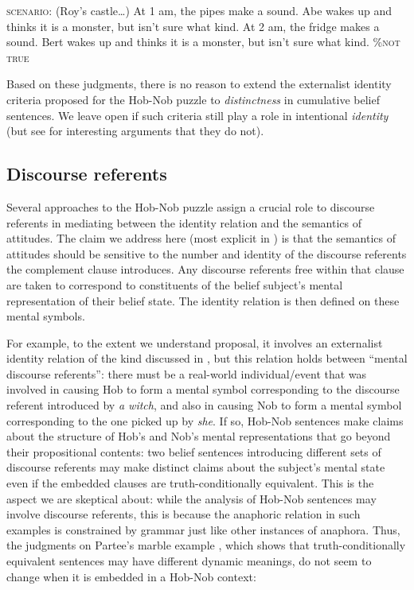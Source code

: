 \documentclass[output=paper]{langscibook}
\begin{document}
\eanoraggedright \label{sch-has:ex:51} \textsc{scenario}: (Roy's castle\ldots) At 1 am, the pipes make a sound. Abe wakes up and thinks it is a monster, but isn't sure what kind. At 2 am, the fridge makes a sound. Bert wakes up and thinks it is a monster, but isn't sure what kind.\hfill {} \textsc{\%not true} \z

\noindent Based on these judgments, there is no reason to extend the externalist identity criteria proposed for the Hob-Nob puzzle to \textit{distinctness} in cumulative belief sentences. We leave open if such criteria still play a role in intentional \textit{identity} (but see \citealt{Edelberg:1992} for interesting arguments that they do not).

\subsection{Discourse referents}\label{sch-has:sec:4.2}

Several approaches to the Hob-Nob puzzle \citep{Dekker:1998,Cumming:2007} assign a crucial role to discourse referents in mediating between the identity relation and the semantics of attitudes. The claim we address here (most explicit in \citealt{Cumming:2007}) is that the semantics of attitudes should be sensitive to the number and identity of the discourse referents the complement clause introduces. Any discourse referents free within that clause are taken to correspond to constituents of the belief subject's mental representation of their belief state. The identity relation is then defined on these mental symbols.

For example, to the extent we understand  proposal, it involves an externalist identity relation of the kind discussed in , but this relation holds between ``mental discourse referents'': there must be a real-world individual/event that was involved in causing Hob to form a mental symbol corresponding to the discourse referent introduced by \textit{a witch}, and also in causing Nob to form a mental symbol corresponding to the one picked up by \textit{she}. If so, Hob-Nob sentences make claims about the structure of Hob's and Nob's mental representations that go beyond their propositional contents: two belief sentences introducing different sets of discourse referents may make distinct claims about the subject's mental state even if the embedded clauses are truth-conditionally equivalent. This is the aspect we are skeptical about: while the analysis of Hob-Nob sentences may involve discourse referents, this is because the anaphoric relation in such examples is constrained by grammar just like other instances of anaphora. Thus, the judgments on Partee's marble example \citep{Heim:1982}, which shows that truth-conditionally equivalent sentences may have different dynamic meanings, do not seem to change when it is embedded in a Hob-Nob context:
\end{document}
